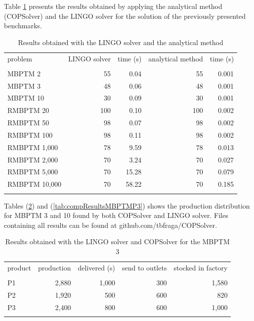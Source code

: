 \documentclass[authoryear,manuscript,12pt]{elsarticle}
\begin{document}
Table \ref{tab:results} presents the results obtained by applying the analytical method (COPSolver) and the LINGO solver for the solution of the previously presented benchmarks.

\begin{table}[h]
\begin{center}
\begin{footnotesize}
\begin{tabular}[c]{l r r r r}
problem & LINGO solver & time (s) & analytical method & time (s) \\
\cline {1-5} \\
MBPTM 2 & 55 & 0.04 & 55 & 0.001 \\
MBPTM 3 & 48 & 0.06 & 48 & 0.001 \\
MBPTM 10 & 30 & 0.09 & 30 & 0.001 \\
RMBPTM 20 & 100 & 0.10 & 100 & 0.002 \\
RMBPTM 50 & 98 & 0.07 & 98 & 0.002\\
RMBPTM 100 & 98 & 0.11 & 98 & 0.002\\
RMBPTM 1,000 & 78 & 9.59 & 78 & 0.013\\
RMBPTM 2,000 & 70 & 3.24 & 70 & 0.027\\
RMBPTM 5,000 & 70 & 15.28 & 70 & 0.079 \\
RMBPTM 10,000 & 70 & 58.22 & 70 & 0.185 \\
\cline {1-5} \\
\end{tabular}
\caption{Results obtained with the LINGO solver and the analytical method}
\label{tab:results}
\end{footnotesize}
\end{center}
\end{table}

Tables (\ref{tab:compResultsMBPTMP2}) and (\ref{tab:compResultsMBPTMP3}) shows the production distribution for MBPTM 3 and 10 found by both COPSolver and LINGO solver. Files containing all results can be found at github.com/tbfraga/COPSolver.

\begin{table}[h]
\begin{center}
\begin{footnotesize}
\begin{tabular}[c]{l r r r r}
product & production & delivered (s) & send to outlets & stocked in factory \\
\cline {1-5} \\
P1 & 2,880 & 1,000 & 300 & 1,580 \\
P2 & 1,920 & 500 & 600 & 820 \\
P3 & 2,400 & 800 & 600 & 1,000 \\
\cline {1-5} \\
\end{tabular}
\caption{Results obtained with the LINGO solver and COPSolver for the MBPTM 3}
\label{tab:compResultsMBPTMP2}
\end{footnotesize}
\end{center}
\end{table}
\end{document}
